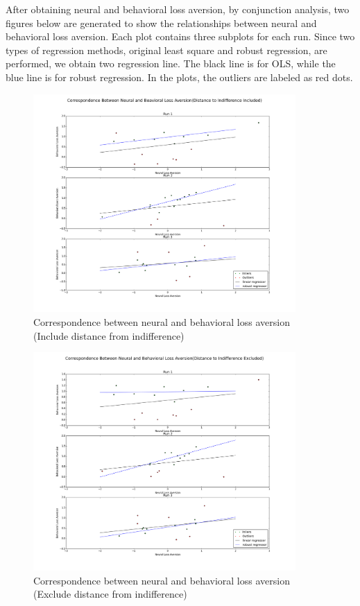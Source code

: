 After obtaining neural and behavioral loss aversion, by conjunction analysis, two figures below are generated to show the relationships between neural and behavioral loss aversion. Each plot contains three subplots for each run. Since two types of regression methods, original least square and robust regression, are performed, we obtain two regression line. The black line is for OLS, while the blue line is for robust regression. In the plots, the outliers are labeled as red dots. 

\begin{figure}[h!]
\centering
\includegraphics[width=100mm]{images/correlation_dist2indiff.png}               
\caption{Correspondence between neural and behavioral loss aversion (Include distance from indifference)}
\label{fig:cor1}
\end{figure}

\begin{figure}[h!]
\centering
\includegraphics[width=100mm]{images/correlation_no_dist2indiff.png}               
\caption{Correspondence between neural and behavioral loss aversion (Exclude distance from indifference)}
\label{fig:cor2}
\end{figure}
